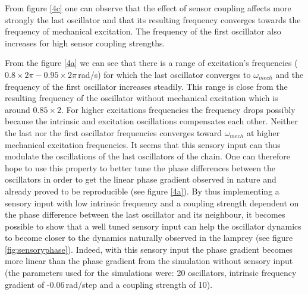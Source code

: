 \documentclass[a4paper]{scrartcl}
\begin{document}
From figure \ref{4c} one can observe that the effect of sensor coupling affects more strongly the last oscillator and that its resulting frequency converges towards the frequency of mechanical excitation. The frequency of the first oscillator also increases for high sensor coupling strengths.

From the figure \ref{4a} we can see that there is a range of excitation's frequencies ($0.8\times2\pi-0.95\times2\pi$\,rad/s) for which the last oscillator converges to $\omega_{mech}$ and the frequency of the first oscillator increases steadily. This range is close from the resulting frequency of the oscillator without mechanical excitation which is around $0.85\times2$. For higher excitations frequencies the frequency drops possibly because the intrinsic and excitation oscillations compensates each other. Neither the last nor the first oscillator frequencies converges toward $\omega_{mech}$ at higher mechanical excitation frequencies.
It seems that this sensory input can thus modulate the oscillations of the last oscillators of the chain. One can therefore hope to use this property to better tune the phase differences between the oscillators in order to get the linear phase gradient observed in nature and already proved to be reproducible (see figure \ref{4a}). By thus implementing a sensory input with low intrinsic frequency and a coupling strength dependent on the phase difference between the last oscillator and its neighbour, it becomes possible to show that a well tuned sensory input can help the oscillator dynamics to become closer to the dynamics naturally observed in the lamprey (see figure \ref{fig:sensoryphase}). Indeed, with this sensory input the phase gradient becomes more linear than the phase gradient from the simulation without sensory input (the parameters used for the simulations were: 20 oscillators, intrinsic frequency gradient of -0.06\,rad/step and a coupling strength of 10).
\end{document}
